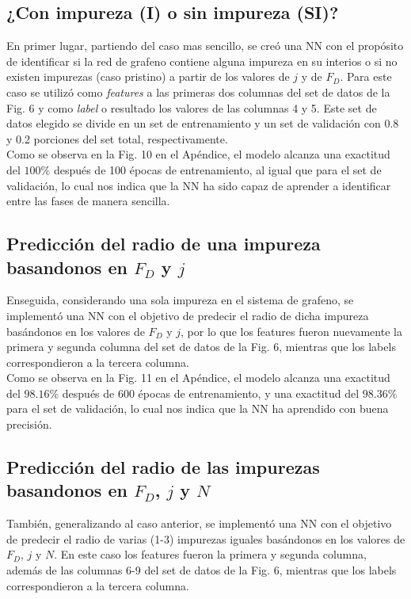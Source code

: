 \documentclass{article}
\begin{document}
\subsection{¿Con impureza (I) o sin impureza (SI)?}
En primer lugar, partiendo del caso mas sencillo, se creó una NN con el propósito de identificar si la red de grafeno contiene alguna impureza en su interios o si no existen impurezas (caso pristino) a partir de los valores de $j$ y de $F_D$. Para este caso se utilizó como \textit{features} a las primeras dos columnas del set de datos de la Fig. 6 y como \textit{label} o resultado los valores de las columnas 4 y 5. Este set de datos elegido se divide en un set de entrenamiento y un set de validación con 0.8 y 0.2 porciones del set total, respectivamente.\\

Como se observa en la Fig. 10 en el Apéndice, el modelo alcanza una exactitud del $100\%$ después de 100 épocas de entrenamiento, al igual que para el set de validación, lo cual nos indica que la NN ha sido capaz de aprender a identificar entre las fases de manera sencilla.

\subsection{Predicción del radio de una impureza basandonos en $F_D$ y $j$}
Enseguida, considerando una sola impureza en el sistema de grafeno, se implementó una NN con el objetivo de predecir el radio de dicha impureza basándonos en los valores de $F_D$ y $j$, por lo que los features fueron nuevamente la primera y segunda columna del set de datos de la Fig. 6, mientras que los labels correspondieron a la tercera columna.\\ 

Como se observa en la Fig. 11 en el Apéndice, el modelo alcanza una exactitud del $98.16\%$ después de 600 épocas de entrenamiento, y una exactitud del $98.36\%$ para el set de validación, lo cual nos indica que la NN ha aprendido con buena precisión.

\subsection{Predicción del radio de las impurezas basandonos en $F_D$, $j$ y $N$}
También, generalizando al caso anterior, se implementó una NN con el objetivo de predecir el radio de varias (1-3) impurezas iguales basándonos en los valores de $F_D$, $j$ y $N$. En este caso los features fueron la primera y segunda columna, además de las columnas 6-9 del set de datos de la Fig. 6, mientras que los labels correspondieron a la tercera columna.\\ 
\end{document}
